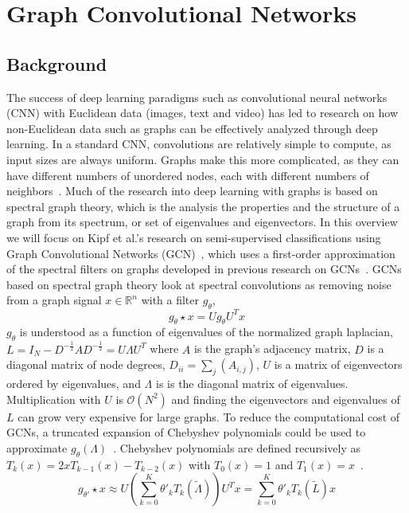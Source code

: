 
\section{Graph Convolutional Networks}

\subsection{Background}
The success of deep learning paradigms such as convolutional neural networks (CNN) with Euclidean data (images, text and video) has led to research on how non-Euclidean data such as graphs can be effectively analyzed through deep learning. In a standard CNN, convolutions are relatively simple to compute, as input sizes are always uniform. Graphs make this more complicated, as they can have different numbers of unordered nodes, each with different numbers of neighbors~\cite{Wu2019}. Much of the research into deep learning with graphs is based on spectral graph theory, which is the analysis the properties and the structure of a graph from its spectrum, or set of eigenvalues and eigenvectors. In this overview we will focus on Kipf et al.'s research on semi-supervised classifications using Graph Convolutional Networks (GCN)~\cite{Kipf2016}, which uses a first-order approximation of the spectral filters on graphs developed in previous research on GCNs~\cite{Bruna2013}. GCNs based on spectral graph theory look at spectral convolutions as removing noise from a graph signal $x \in \mathbb{R}^n$ with a filter $g_\theta$,
\begin{equation}
\label{spectral_prop}
g_\theta \star x = Ug_\theta U^Tx
\end{equation}
$g_\theta$ is understood as a function of eigenvalues of the normalized graph laplacian, $L = I_N - D^{-\frac{1}{2}}AD^{-\frac{1}{2}} = U\Lambda U^T$ where $A$ is the graph's adjacency matrix, $D$ is a diagonal matrix of node degrees, $D_{ii} = \sum_{j} (A_{i,j})$, $U$ is a matrix of eigenvectors ordered by eigenvalues, and $\Lambda$ is is the diagonal matrix of eigenvalues. Multiplication with $U$ is $\mathcal{O}(N^2) $ and finding the eigenvectors and eigenvalues of $L$ can grow very expensive for large graphs. To reduce the computational cost of GCNs, a truncated expansion of Chebyshev polynomials could be used to approximate $g_\theta (\Lambda)$~\cite{Defferrard2016}.
Chebyshev polynomials are defined recursively as $T_k(x) = 2xT_{k-1}(x) - T_{k-2}(x)$ with $T_0(x) = 1$ and $T_1(x) = x$~\cite{Hammond2011}.
\begin{equation}
\label{cheby_prop}
g_{\theta'} \star x \approx U(\sum\limits_{k=0}^{K}\theta'_k T_k (\tilde{\Lambda}))U^Tx = \sum\limits_{k=0}^{K} \theta'_k T_k (\tilde{L})x
\end{equation}
